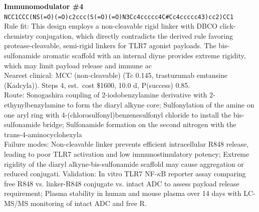\documentclass[10pt]{article}
\begin{document}
\noindent\textbf{Immunomodulator \#4} \\ \texttt{NCC1CCC(NS(=O)(=O)c2ccc(S(=O)(=O)N3Cc4ccccc4C\#Cc4ccccc43)cc2)CC1} \\ Rule fit: This design employs a non-cleavable rigid linker with DBCO click-chemistry conjugation, which directly contradicts the derived rule favoring protease-cleavable, semi-rigid linkers for TLR7 agonist payloads. The bis-sulfonamide aromatic scaffold with an internal diyne provides extreme rigidity, which may limit payload release and immune ac \\ Nearest clinical: MCC (non-cleavable) (Tc 0.145, trastuzumab emtansine (Kadcyla)). Steps 4, est.\ cost \$1600, 10.0 d, P(success) 0.85. \\ Route: Sonogashira coupling of 2-iodobenzylamine derivative with 2-ethynylbenzylamine to form the diaryl alkyne core; Sulfonylation of the amine on one aryl ring with 4-(chlorosulfonyl)benzenesulfonyl chloride to install the bis-sulfonamide bridge; Sulfonamide formation on the second nitrogen with the trans-4-aminocyclohexyla \\ Failure modes: Non-cleavable linker prevents efficient intracellular R848 release, leading to poor TLR7 activation and low immunostimulatory potency; Extreme rigidity of the diaryl alkyne-bis-sulfonamide scaffold may cause aggregation or reduced conjugati. Validation: In vitro TLR7 NF-$\kappa$B reporter assay comparing free R848 vs. linker-R848 conjugate vs. intact ADC to assess payload release requirement; Plasma stability in human and mouse plasma over 14 days with LC-MS/MS monitoring of intact ADC and free R. \\[0.4em]
\end{document}
